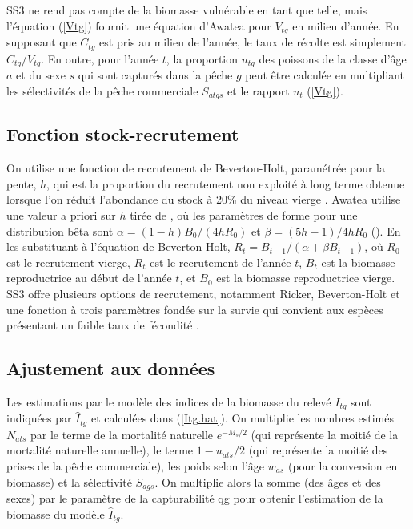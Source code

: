 \documentclass[11pt]{book}
\newcommand{\pc}{\%}
\newcommand{\eref}[1]{(\ref{#1})}
\begin{document}
SS3 ne rend pas compte de la biomasse vuln\'{e}rable en tant que telle, mais l'\'{e}quation \eref{Vtg} fournit une \'{e}quation d'Awatea pour $V_{tg}$ en milieu d'ann\'{e}e.
En supposant que $C_{tg}$ est pris au milieu de l'ann\'{e}e, le taux de r\'{e}colte est simplement $C_{tg} / V_{tg}$.
En outre, pour l'ann\'{e}e $t$, la proportion $u_{tg}$ des poissons de la classe d'\^{a}ge $a$ et du sexe $s$ qui sont captur\'{e}s dans la p\^{e}che $g$ peut \^{e}tre calcul\'{e}e en multipliant les s\'{e}lectivit\'{e}s de la p\^{e}che commerciale $S_{atgs}$ et le rapport $u_t$ \eref{Vtg}.

\subsection{Fonction stock-recrutement}

On utilise une fonction de recrutement de Beverton-Holt, param\'{e}tr\'{e}e pour la pente, $h$, qui est la proportion du recrutement non exploit\'{e} \`{a} long terme obtenue lorsque l'on r\'{e}duit l'abondance du stock \`{a} 20\pc{} du niveau vierge \citep{Mace-Doonan:1988, Michielsens-McAllister:2004}.
Awatea utilise une valeur a priori sur $h$ tir\'{e}e de \citet{Forrest-etal:2010}, o\`{u} les param\`{e}tres de forme pour une distribution b\^{e}ta sont $\alpha = (1 - h) B_0 / (4 h R_0)$ et $\beta = (5 h - 1) / 4 h R_0$ (\citealt{Hilborn-etal:2003, Michielsens-McAllister:2004}). 
En les substituant \`{a} l'\'{e}quation de Beverton-Holt, $R_t = B_{t-1} / (\alpha + \beta B_{t-1})$, o\`{u} $R_0$ est le recrutement vierge, $R_t$ est le recrutement de l'ann\'{e}e $t$, $B_t$ est la biomasse reproductrice au d\'{e}but de l'ann\'{e}e $t$, et $B_0$ est la biomasse reproductrice vierge.
SS3 offre plusieurs options de recrutement, notamment Ricker, Beverton-Holt et une fonction \`{a} trois param\`{e}tres fond\'{e}e sur la survie qui convient aux esp\`{e}ces pr\'{e}sentant un faible taux de f\'{e}condit\'{e} \citep{Taylor-etal:2013}.

\subsection{Ajustement aux donn\'{e}es}

Les estimations par le mod\`{e}le des indices de la biomasse du relev\'{e} $I_{tg}$ sont indiqu\'{e}es par $\widehat{I}_{tg}$ et calcul\'{e}es dans \eref{Itg.hat}.
On multiplie les nombres estim\'{e}s $N_{ats}$ par le terme de la mortalit\'{e} naturelle $e^{-M_s / 2}$ (qui repr\'{e}sente la moiti\'{e} de la mortalit\'{e} naturelle annuelle), le terme $1 - u_{ats} / 2$ (qui repr\'{e}sente la moiti\'{e} des prises de la p\^{e}che commerciale), les poids selon l'\^{a}ge $w_{as}$ (pour la conversion en biomasse) et la s\'{e}lectivit\'{e} $S_{ags}$. 
On multiplie alors la somme (des \^{a}ges et des sexes) par le param\`{e}tre de la capturabilit\'{e} qg pour obtenir l'estimation de la biomasse du mod\`{e}le $\widehat{I}_{tg}$. 
\end{document}
